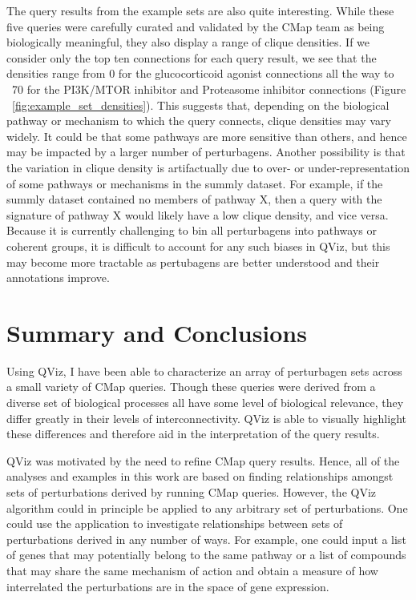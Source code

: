 \documentclass[12pt]{article}
\begin{document}
The query results from the example sets are also quite interesting. While these five queries were carefully curated and validated by the CMap team as being biologically meaningful, they also display a range of clique densities. If we consider only the top ten connections for each query result, we see that the densities range from 0 for the glucocorticoid agonist connections all the way to ~70 for the PI3K/MTOR inhibitor and Proteasome inhibitor connections (Figure ~\ref{fig:example_set_densities}). This suggests that, depending on the biological pathway or mechanism to which the query connects, clique densities may vary widely. It could be that some pathways are more sensitive than others, and hence may be impacted by a larger number of perturbagens. Another possibility is that the variation in clique density is artifactually due to over- or under-representation of some pathways or mechanisms in the summly dataset. For example, if the summly dataset contained no members of pathway X, then a query with the signature of pathway X would likely have a low clique density, and vice versa. Because it is currently challenging to bin all perturbagens into pathways or coherent groups, it is difficult to account for any such biases in QViz, but this may become more tractable as pertubagens are better understood and their annotations improve.



\section{Summary and Conclusions}
Using QViz, I have been able to characterize an array of perturbagen sets across a small variety of CMap queries. Though these queries were derived from a diverse set of biological processes all have some level of biological relevance, they differ greatly in their levels of interconnectivity. QViz is able to visually highlight these differences and therefore aid in the interpretation of the query results.

QViz was motivated by the need to refine CMap query results. Hence, all of the analyses and examples in this work are based on finding relationships amongst sets of perturbations derived by running CMap queries. However, the QViz algorithm could in principle be applied to any arbitrary set of perturbations. One could use the application to investigate relationships between sets of perturbations derived in any number of ways. For example, one could input a list of genes that may potentially belong to the same pathway or a list of compounds that may share the same mechanism of action and obtain a measure of how interrelated the perturbations are in the space of gene expression.
\end{document}
